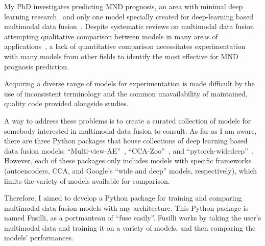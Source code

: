 My PhD investigates predicting MND prognosis, an area with minimal deep learning research~\cite{pancottiDeepLearningMethods2022, mullerExplainableModelsDisease2021} and only one model specially created for deep-learning based multimodal data fusion~\cite{vanderburghDeepLearningPredictions2017}.
Despite systematic reviews on multimodal data fusion attempting qualitative comparison between models in many areas of applications~\cite{cuiDeepMultimodalFusion2022, gaoSurveyDeepLearning2020, stahlschmidtMultimodalDeepLearning2022, yanDeepMultiviewLearning2021}, a lack of quantitative comparison necessitates experimentation with many models from other fields to identify the most effective for MND prognosis prediction.

Acquiring a diverse range of models for experimentation is made difficult by the use of inconsistent terminology and the common unavailability of maintained, quality code provided alongside studies.

A way to address these problems is to create a curated collection of models for somebody interested in multimodal data fusion to consult.
As far as I am aware, there are three Python packages that house collections of deep learning based data fusion models: ``Multi-view-AE''~\cite{aguilaMultiviewAEPythonPackage2023}, ``CCA-Zoo''~\cite{chapmanCCAZooCollectionRegularized2021}, and ``pytorch-widedeep''~\cite{zaurinPytorchwidedeepFlexiblePackage2023}.
However, each of these packages only includes models with specific frameworks (autoencoders, CCA, and Google's ``wide and deep'' models, respectively), which limits the variety of models available for comparison.

Therefore, I aimed to develop a Python package for training and comparing multimodal data fusion models with any architecture.
This Python package is named Fusilli, as a portmanteau of ``fuse easily''.
Fusilli works by taking the user's multimodal data and training it on a variety of models, and then comparing the models' performances.


